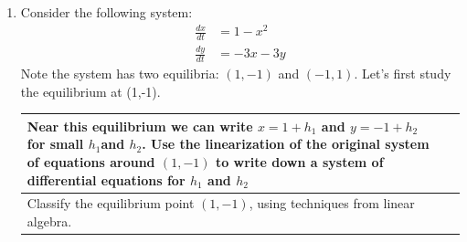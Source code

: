 \begin{enumerate}[resume]

\item Consider the following system: \label{15problem9}
\begin{align*}
\frac{dx}{dt} &= 1-x^2 \\
\frac{dy}{dt} &= -3x -3y
\end{align*}
Note the system has two equilibria: $(1,-1)$ and $(-1,1)$.   Let's first study the equilibrium at (1,-1). \label{15problem10}






\begin{tabular}{|p{2.5in}|p{3in}|}
\hline
Near this equilibrium we can write $x=1+h_1$ and $y=-1+h_2$ for small $h_1$and $h_2$. Use the linearization of the original system of equations around $(1,-1)$ to write down a system of differential equations for $h_1$ and $h_2$ \vspace{2in} &  \\ \hline
Classify the equilibrium point $(1,-1)$, using techniques from linear algebra. \vspace{2in} &  \\ \hline
\end{tabular}


\end{enumerate}
